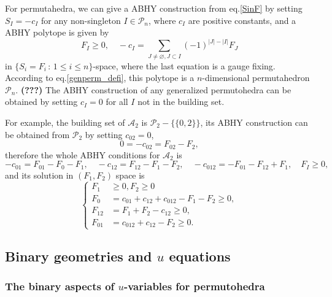 \documentclass[hidelinks,12pt]{article}
\begin{document}
\begin{enumerate}
For permutahedra, we can give a ABHY construction from eq.\eqref{SinF} by setting 
$S_I=-c_I$ for any non-singleton $I\in \mathscr P_n$, where $c_I$ are positive 
constants, and a ABHY polytope is given by 
\begin{equation}\label{ABHY}
	F_I\geq 0,\quad -c_I=\sum_{J\neq \varnothing,J\subset I}(-1)^{|J|-|I|}F_J
\end{equation}
in $\{S_i=F_i\,:\,1\leq i\leq n\}$-space, where the last equation is a gauge fixing. 
According to eq.\eqref{genperm_defi}, this polytope is a $n$-dimensional 
permutahedron $\mathscr P_n$. {\bf (???)}
The ABHY construction of any generalized permutohedra can be obtained by 
setting $c_I=0$ for all $I$ not in the building set.

For example, the building set of $\mathscr A_2$ is $\mathscr P_2-\{\{0,2\}\}$,
its ABHY construction can be obtained from $\mathscr P_2$ by setting $c_{02}=0$, 
\[
	0=-c_{02}=F_{02}-F_2,
\]
therefore the whole ABHY conditions for $\mathscr A_2$ is 
\[
	-c_{01}=F_{01}-F_0-F_1,\quad -c_{12}=F_{12}-F_1-F_2,\quad 
	-c_{012}=-F_{01}-F_{12}+F_1,\quad F_I\geq 0,
\]
and its solution in $(F_1,F_2)$ space is 
\[
	\left\{\begin{aligned}
		F_1&\geq 0,F_2\geq 0\\
		F_0&=c_{01}+c_{12}+c_{012}-F_1-F_2\geq 0,\\
		F_{12}&=F_1+F_2-c_{12}\geq 0,\\
		F_{01}&=c_{012}+c_{12}-F_2\geq 0.
	\end{aligned}\right.
\]

\subsection{Binary geometries and $u$ equations}


\subsubsection{The binary aspects of $u$-variables for permutohedra}


\end{enumerate}
\end{document}
